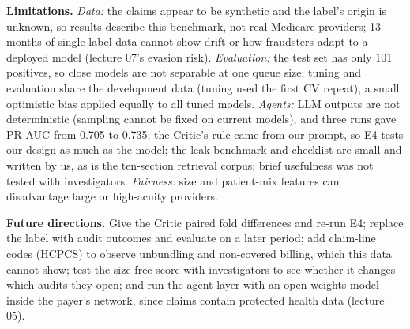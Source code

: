 \documentclass[11pt,a4paper]{article}
\begin{document}
\textbf{Limitations.} \emph{Data:} the claims appear to be synthetic and the label's origin is unknown, so results describe this benchmark, not real Medicare providers; 13 months of single-label data cannot show drift or how fraudsters adapt to a deployed model (lecture 07's evasion risk). \emph{Evaluation:} the test set has only 101 positives, so close models are not separable at one queue size; tuning and evaluation share the development data (tuning used the first CV repeat), a small optimistic bias applied equally to all tuned models. \emph{Agents:} LLM outputs are not deterministic (sampling cannot be fixed on current models), and three runs gave PR-AUC from 0.705 to 0.735; the Critic's rule came from our prompt, so E4 tests our design as much as the model; the leak benchmark and checklist are small and written by us, as is the ten-section retrieval corpus; brief usefulness was not tested with investigators. \emph{Fairness:} size and patient-mix features can disadvantage large or high-acuity providers.

\textbf{Future directions.} Give the Critic paired fold differences and re-run E4; replace the label with audit outcomes and evaluate on a later period; add claim-line codes (HCPCS) to observe unbundling and non-covered billing, which this data cannot show; test the size-free score with investigators to see whether it changes which audits they open; and run the agent layer with an open-weights model inside the payer's network, since claims contain protected health data (lecture 05).
\end{document}
